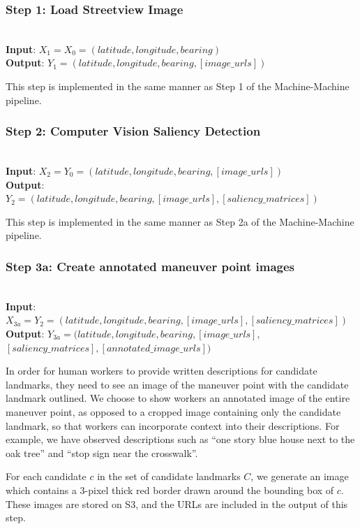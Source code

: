 \subsubsection*{Step 1: Load Streetview Image}~\\
\noindent\textbf{Input}: $X_1 = X_0 = (latitude, longitude, bearing)$\\
\textbf{Output}: $Y_1 = (latitude, longitude, bearing, [image\_urls])$

This step is implemented in the same manner as Step 1 of the Machine-Machine pipeline.

\subsubsection*{Step 2: Computer Vision Saliency Detection}~\\
\noindent\textbf{Input}: $X_2 = Y_0 = (latitude, longitude, bearing, [image\_urls])$\\
\textbf{Output}: $Y_2 = (latitude, longitude, bearing, [image\_urls], [saliency\_matrices])$ 

This step is implemented in the same manner as Step 2a of the Machine-Machine pipeline.

\subsubsection*{Step 3a: Create annotated maneuver point images}~\\
\noindent\textbf{Input}: $X_{3a} = Y_2 = (latitude, longitude, bearing, [image\_urls], [saliency\_matrices])$ \\
\textbf{Output}: $Y_{3a} = (latitude, longitude, bearing, [image\_urls],$\\$ [saliency\_matrices], [annotated\_image\_urls])$ 

In order for human workers to provide written descriptions for candidate landmarks, they need to see an image of the maneuver point with the candidate landmark outlined. We choose to show workers an annotated image of the entire maneuver point, as opposed to a cropped image containing only the candidate landmark, so that workers can incorporate context into their descriptions. For example, we have observed descriptions such as “one story blue house next to the oak tree” and “stop sign near the crosswalk”.

For each candidate $c$ in the set of candidate landmarks $C$, we generate an image which contains a 3-pixel thick red border drawn around the bounding box of $c$. These images are stored on S3, and the URLs are included in the output of this step.

